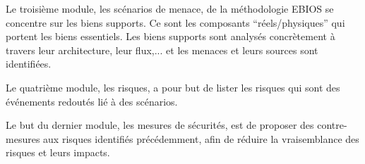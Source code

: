 Le troisième module, les scénarios de menace, de la méthodologie EBIOS se concentre sur les biens supports. Ce sont les composants “réels/physiques” qui portent les biens essentiels. Les biens supports sont analysés concrètement à travers leur architecture, leur flux,... et les menaces et leurs sources sont identifiées.

Le quatrième module, les risques, a pour but de lister les risques qui sont des événements redoutés lié à des scénarios.

Le but du dernier module, les mesures de sécurités, est de proposer des contre-mesures aux risques identifiés précédemment, afin de réduire la vraisemblance des risques et leurs impacts.

